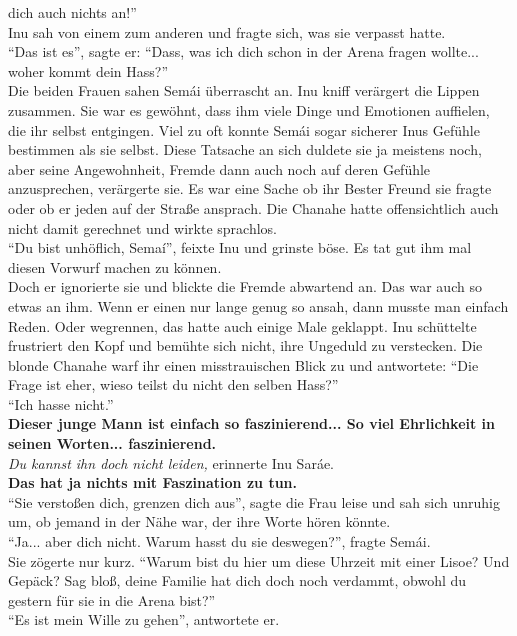 dich auch nichts an!''\\
Inu sah von einem zum anderen und fragte sich, was sie verpasst hatte.\\
``Das ist es'', sagte er: ``Dass, was ich dich schon in der Arena fragen wollte... woher kommt dein 
Hass?''\\
Die beiden Frauen sahen Semái überrascht an. Inu kniff verärgert die Lippen zusammen. Sie war es 
gewöhnt, dass ihm viele Dinge und Emotionen auffielen, die ihr selbst entgingen. Viel zu oft konnte 
Semái sogar sicherer Inus Gefühle bestimmen als sie selbst. Diese Tatsache an sich duldete sie ja 
meistens noch, aber seine Angewohnheit, Fremde dann auch noch auf deren Gefühle anzusprechen, 
verärgerte sie. Es war eine Sache ob ihr Bester Freund sie fragte oder ob er jeden auf der Straße 
ansprach. Die Chanahe hatte offensichtlich auch nicht damit gerechnet und wirkte sprachlos.\\
``Du bist unhöflich, Semaí'', feixte Inu und grinste böse. Es tat gut ihm mal diesen Vorwurf 
machen zu können.\\
Doch er ignorierte sie und blickte die Fremde abwartend an. Das war auch so etwas an ihm. Wenn er 
einen nur lange genug so ansah, dann musste man einfach Reden. Oder wegrennen, das hatte auch 
einige Male geklappt. Inu schüttelte frustriert den Kopf und bemühte sich nicht, ihre Ungeduld zu 
verstecken. Die blonde Chanahe warf ihr einen misstrauischen Blick zu und antwortete: ``Die Frage 
ist eher, wieso teilst du nicht den selben Hass?''\\
``Ich hasse nicht.''\\
\textbf{Dieser junge Mann ist einfach so faszinierend... So viel Ehrlichkeit in seinen Worten... 
faszinierend.}\\
\textit{Du kannst ihn doch nicht leiden,} erinnerte Inu Saráe.\\
\textbf{Das hat ja nichts mit Faszination zu tun.}\\
``Sie verstoßen dich, grenzen dich aus'', sagte die Frau leise und sah sich unruhig um, ob jemand 
in der Nähe war, der ihre Worte hören könnte.\\
``Ja... aber dich nicht. Warum hasst du sie deswegen?'', fragte Semái.\\
Sie zögerte nur kurz. ``Warum bist du hier um diese Uhrzeit mit einer Lisoe? Und Gepäck? Sag bloß, 
deine Familie hat dich doch noch verdammt, obwohl du gestern für sie in die Arena bist?''\\
``Es ist mein Wille zu gehen'', antwortete er.\\
